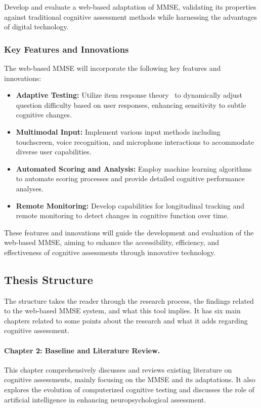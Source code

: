 Develop and evaluate a web-based adaptation of MMSE, validating its properties against traditional cognitive assessment methods while harnessing the advantages of digital technology.

\subsubsection{Key Features and Innovations}

The web-based MMSE will incorporate the following key features and innovations:

\begin{itemize}
    \item \textbf{Adaptive Testing:} Utilize item response theory~\cite{embretson2013item} to dynamically adjust question difficulty based on user responses, enhancing sensitivity to subtle cognitive changes.
    
    \item \textbf{Multimodal Input:} Implement various input methods including touchscreen, voice recognition, and microphone interactions to accommodate diverse user capabilities.
    
    \item \textbf{Automated Scoring and Analysis:} Employ machine learning algorithms~\cite{shatte2019machine} to automate scoring processes and provide detailed cognitive performance analyses.
    
    \item \textbf{Remote Monitoring:} Develop capabilities for longitudinal tracking and remote monitoring to detect changes in cognitive function over time.
\end{itemize}

These features and innovations will guide the development and evaluation of the web-based MMSE, aiming to enhance the accessibility, efficiency, and effectiveness of cognitive assessments through innovative technology.

\subsection{Thesis Structure}

The structure takes the reader through the research process, the findings related to the web-based MMSE system, and what this tool implies. It has six main chapters related to some points about the research and what it adds regarding cognitive assessment.

\paragraph{Chapter 2: Baseline and Literature Review.} This chapter comprehensively discusses and reviews existing literature on cognitive assessments, mainly focusing on the MMSE and its adaptations. It also explores the evolution of computerized cognitive testing and discusses the role of artificial intelligence in enhancing neuropsychological assessment.


